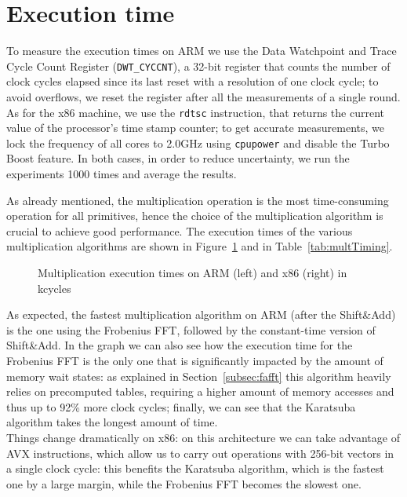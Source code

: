 \section{Execution time}

To measure the execution times on ARM we use the Data Watchpoint and Trace Cycle Count Register (\texttt{DWT\_CYCCNT}),
a 32-bit register that counts the number of clock cycles elapsed since its last reset with a resolution
of one clock cycle; to avoid overflows, we reset the register after all the measurements of a single round.
As for the x86 machine, we use the \texttt{rdtsc} instruction, that returns the current value of the processor's time stamp counter;
to get accurate measurements, we lock the frequency of all cores to 2.0GHz using \texttt{cpupower} and disable
the Turbo Boost feature.
In both cases, in order to reduce uncertainty, we run the experiments 1000 times and average the results.

As already mentioned, the multiplication operation is the most time-consuming operation for all primitives, hence the choice of
the multiplication algorithm is crucial to achieve good performance. The execution times of the various multiplication algorithms
are shown in Figure~\ref{fig:multTiming} and in Table~\ref{tab:multTiming}.

\begin{figure}[!t]
    \hspace{-10pt}
    \subfloat{
        \ARMtimingplotmult{\armMultTiming}
    }
    \subfloat{
        \xtimingplotmult{\xMultTiming}
    }
    \centering
    \newline
    \timingLegend
    \caption{Multiplication execution times on ARM (left) and x86 (right) in kcycles}
    \label{fig:multTiming}
\end{figure}
As expected, the fastest multiplication algorithm on ARM (after the Shift\&Add) is the one using the Frobenius FFT, followed by the
constant-time version of Shift\&Add. In the graph we can also see how the execution time for the Frobenius FFT is the only one
that is significantly impacted by the amount of memory wait states: as explained in Section~\ref{subsec:fafft} this algorithm heavily
relies on precomputed tables, requiring a higher amount of memory accesses and thus up to 92\% more clock cycles; finally, 
we can see that the Karatsuba algorithm takes the longest amount of time.\\
Things change dramatically on x86: on this architecture we can take advantage of AVX instructions, which allow us to carry out
operations with 256-bit vectors in a single clock cycle: this benefits the Karatsuba algorithm, which is the fastest one by a large margin,
while the Frobenius FFT becomes the slowest one.

